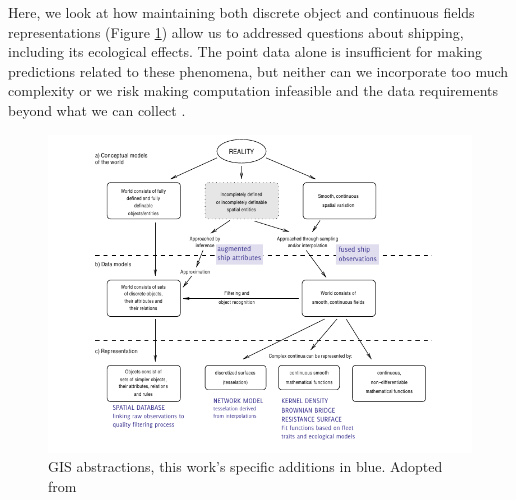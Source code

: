 Here, we look at how maintaining both discrete object and continuous fields representations (Figure \ref{fig:representation-in-gis}) allow us to addressed questions about shipping, including its ecological effects. The point data alone is insufficient for making predictions related to these phenomena, but neither can we incorporate too much complexity or we risk making computation infeasible and the data requirements beyond what we can collect \citep{de2007geospatial}.




\begin{figure}[htbp]
  \centering
  \includegraphics[width=160mm]{figures/representation-in-gis.pdf}
  \caption{GIS abstractions, this work's specific {\color{DBlue} additions in blue}. Adopted from \cite{Bivand2011}}
  \label{fig:representation-in-gis}
\end{figure}


